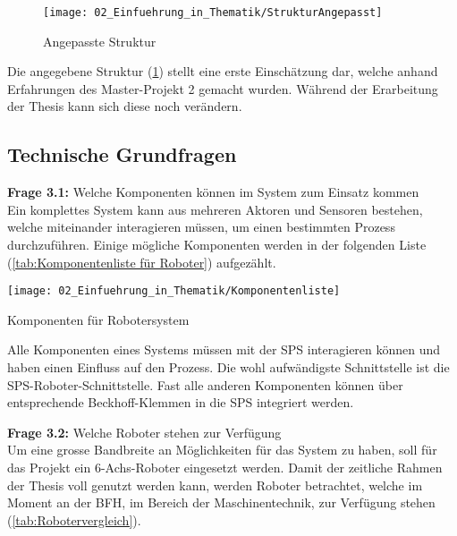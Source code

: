 		\begin{figure}[h!]
			\centering
			\texttt{[image: 02\_Einfuehrung\_in\_Thematik/StrukturAngepasst]}
			\captionsetup{justification=centering}
			\caption{Angepasste Struktur}
			\label{fig:StrukturAngepasst}
		\end{figure}
		
		Die angegebene Struktur (\ref{fig:StrukturAngepasst}) stellt eine erste Einschätzung dar, welche anhand Erfahrungen des Master-Projekt 2 gemacht wurden. Während der Erarbeitung der Thesis kann sich diese noch verändern. 
	
	\newpage
	
	\subsection{Technische Grundfragen} \label{Technische Grundfragen}
	
	\textbf{Frage 3.1:} Welche Komponenten können im System zum Einsatz kommen \vspace{2mm} 
	\\
		Ein komplettes System kann aus mehreren Aktoren und Sensoren bestehen, welche miteinander interagieren müssen, um einen bestimmten Prozess durchzuführen. Einige mögliche Komponenten werden in der folgenden Liste (\ref{tab:Komponentenliste für Roboter}) aufgezählt.
		
		\begin{table}[h!]
			\centering
			\texttt{[image: 02\_Einfuehrung\_in\_Thematik/Komponentenliste]}
			\captionsetup{justification=centering}
			\caption{Komponenten für Robotersystem}
			\label{tab:Komponentenliste für Roboter}
		\end{table}
		
		Alle Komponenten eines Systems müssen mit der SPS interagieren können und haben einen Einfluss auf den Prozess. Die wohl aufwändigste Schnittstelle ist die SPS-Roboter-Schnittstelle. Fast alle anderen Komponenten können über entsprechende Beckhoff-Klemmen in die SPS integriert werden.
	
	\vspace{3mm}
	
	\textbf{Frage 3.2:} Welche Roboter stehen zur Verfügung \vspace{2mm} 
	\\
		Um eine grosse Bandbreite an Möglichkeiten für das System zu haben, soll für das Projekt ein 6-Achs-Roboter eingesetzt werden. Damit der zeitliche Rahmen der Thesis voll genutzt werden kann, werden Roboter betrachtet, welche im Moment an der BFH, im Bereich der Maschinentechnik, zur Verfügung stehen (\ref{tab:Robotervergleich}). 
		

